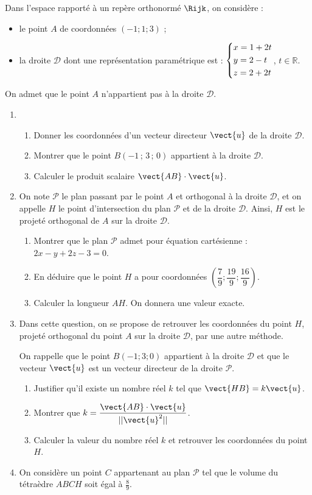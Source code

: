 Dans l’espace rapporté à un repère orthonormé $\Rijk$, on considère :

\begin{itemize}
	\item le point $A$ de coordonnées $(-1;1;3)$ ;
	\item la droite $\mathcal{D}$ dont une représentation paramétrique est : $\begin{dcases} x=1+2t\\y=2-t\\z=2+2t\end{dcases}$, $t \in \mathbb{R}$.
\end{itemize}

On admet que le point $A$ n’appartient pas à la droite $\mathcal{D}$.

\begin{enumerate}
	\item 
	\begin{enumerate}
		\item Donner les coordonnées d’un vecteur directeur $\vect{u}$ de la droite $\mathcal{D}$.
		\item Montrer que le point $B(-1\,;\,3\,;\,0)$ appartient à la droite $\mathcal{D}$.
		\item Calculer le produit scalaire $\vect{AB}\cdot\vect{u}$.
	\end{enumerate}
	\item On note $\mathcal{P}$ le plan passant par le point $A$ et orthogonal à la droite $\mathcal{D}$, et on appelle $H$ le point d’intersection du plan $\mathcal{P}$ et de la droite $\mathcal{D}$. Ainsi, $H$ est le projeté orthogonal de $A$ sur la droite $\mathcal{D}$.
	\begin{enumerate}
		\item Montrer que le plan $\mathcal{P}$ admet pour équation cartésienne : $2x-y+2z-3=0$.
		\item En déduire que le point $H$ a pour coordonnées $\left( \dfrac{7}{9};\dfrac{19}{9};\dfrac{16}{9}\right)$.
		\item Calculer la longueur $AH$. On donnera une valeur exacte.
	\end{enumerate}
	\item Dans cette question, on se propose de retrouver les coordonnées du point $H$, projeté orthogonal du point $A$ sur la droite $\mathcal{D}$, par une autre méthode.
	
	\smallskip
	
	On rappelle que le point $B(-1;3;0)$ appartient à la droite $\mathcal{D}$ et que le vecteur $\vect{u}$ est un vecteur directeur de la droite $\mathcal{P}$.
	\begin{enumerate}
		\item Justifier qu’il existe un nombre réel $k$ tel que $\vect{HB}=k\vect{u}$.
		\item Montrer que $k=\dfrac{\vect{AB}\cdot\vect{u}}{||\vect{u}^2||}$.
		\item Calculer la valeur du nombre réel $k$ et retrouver les coordonnées du point $H$. 
	\end{enumerate}
	\item On considère un point $C$ appartenant au plan $\mathcal{P}$ tel que le volume du tétraèdre $ABCH$ soit égal à $\frac89$.
	

\end{enumerate}

